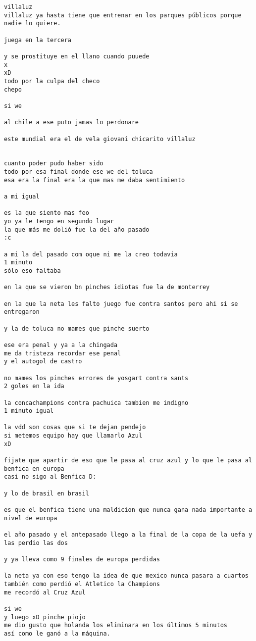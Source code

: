 \begin{verbatim}
villaluz 
villaluz ya hasta tiene que entrenar en los parques públicos porque nadie lo quiere.

juega en la tercera

y se prostituye en el llano cuando puuede
x
xD
todo por la culpa del checo
chepo

si we

al chile a ese puto jamas lo perdonare

este mundial era el de vela giovani chicarito villaluz


cuanto poder pudo haber sido
todo por esa final donde ese we del toluca
esa era la final era la que mas me daba sentimiento

a mi igual

es la que siento mas feo
yo ya le tengo en segundo lugar
la que más me dolió fue la del año pasado
:c

a mi la del pasado com oque ni me la creo todavia
1 minuto
sólo eso faltaba

en la que se vieron bn pinches idiotas fue la de monterrey

en la que la neta les falto juego fue contra santos pero ahi si se entregaron

y la de toluca no mames que pinche suerto

ese era penal y ya a la chingada
me da tristeza recordar ese penal
y el autogol de castro

no mames los pinches errores de yosgart contra sants
2 goles en la ida

la concachampions contra pachuica tambien me indigno
1 minuto igual

la vdd son cosas que si te dejan pendejo
si metemos equipo hay que llamarlo Azul
xD

fijate que apartir de eso que le pasa al cruz azul y lo que le pasa al benfica en europa
casi no sigo al Benfica D:

y lo de brasil en brasil

es que el benfica tiene una maldicion que nunca gana nada importante a nivel de europa

el año pasado y el antepasado llego a la final de la copa de la uefa y las perdio las dos

y ya lleva como 9 finales de europa perdidas

la neta ya con eso tengo la idea de que mexico nunca pasara a cuartos
también como perdió el Atletico la Champions
me recordó al Cruz Azul

si we
y luego xD pinche piojo
me dio gusto que holanda los eliminara en los últimos 5 minutos
así como le ganó a la máquina.


\end{verbatim}
